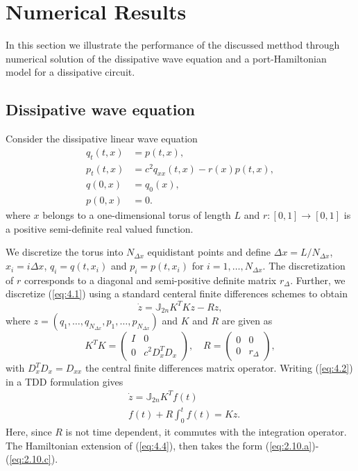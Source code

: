 \section{Numerical Results} \label{sec:4}
In this section we illustrate the performance of the discussed metthod through numerical solution of the dissipative wave equation and a port-Hamiltonian model for a dissipative circuit.

\subsection{Dissipative wave equation}

Consider the dissipative linear wave equation
\begin{equation} \label{eq:4.1}
	\begin{aligned}
		q_{t}(t,x) &= p(t,x), \\
		p_{t}(t,x) &= c^2 q_{xx}(t,x) - r(x)  p(t,x) , \\
		q(0,x) &= q_0(x), \\
		p(0,x) &= 0.
	\end{aligned}
\end{equation}
where $x$ belongs to a one-dimensional torus of length $L$ and $r:[0,1]\to[0,1]$ is a positive semi-definite real valued function. 

We discretize the torus into $N_{\Delta x}$ equidistant points and define $\Delta x = L/N_{\Delta x}$, $x_i = i\Delta x$, $q_i=q(t,x_i)$ and $p_i=p(t,x_i)$ for $i = 1, \dots, N_{\Delta x}$. The discretization of $r$ corresponds to a diagonal and semi-positive definite matrix $r_\Delta$. Further, we discretize (\ref{eq:4.1}) using a standard centeral finite differences schemes to obtain
\begin{equation} \label{eq:4.2}
	\dot z = \mathbb J_{2n} K^T K z - R z,
\end{equation}
where $z = (q_1,\dots,q_{N_{\Delta x}},p_1,\dots,p_{N_{\Delta x}})$ and $K$ and $R$ are given as
\begin{equation} \label{eq:4.3}
	K^T K =
	\begin{pmatrix}
		I & 0 \\
		0 & c^2D_x^TD_x
	\end{pmatrix} , \quad
	R =
	\begin{pmatrix}
		0 & 0 \\
		0 & r_\Delta
	\end{pmatrix},
\end{equation}
with $D_x^TD_x = D_{xx}$ the central finite differences matrix operator. Writing (\ref{eq:4.2}) in a TDD formulation gives
\begin{equation} \label{eq:4.4}
\begin{aligned}
	& \dot z = \mathbb J_{2n} K^T f(t) \\
	& f(t) + R \int_0^t f(t) = K z.
\end{aligned}
\end{equation}
Here, since $R$ is not time dependent, it commutes with the integration operator. The Hamiltonian extension of (\ref{eq:4.4}), then takes the form (\ref{eq:2.10.a})-(\ref{eq:2.10.c}).

